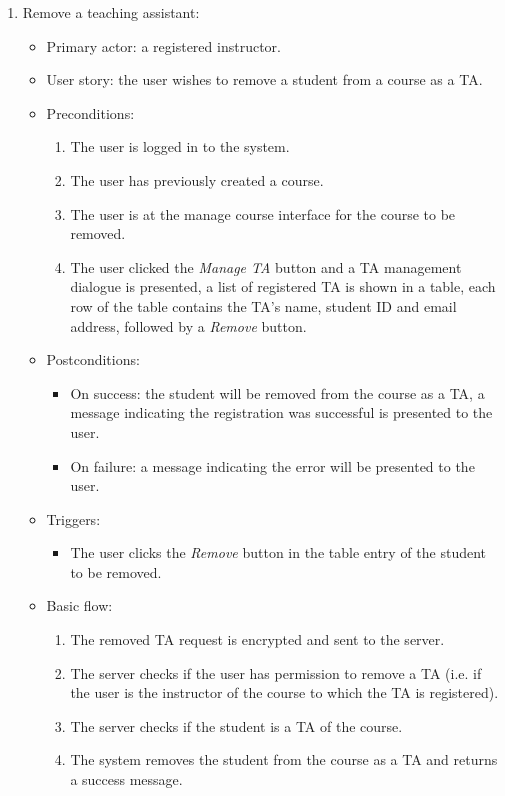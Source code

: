 \begin{enumerate}
\item Remove a teaching assistant:
\begin{itemize}
    \item Primary actor: a registered instructor.
    \item User story: the user wishes to remove a student from a course as a
        TA.
    \item Preconditions:
        \begin{enumerate}
            \item The user is logged in to the system.
            \item The user has previously created a course.
            \item The user is at the manage course interface for the course
                to be removed.
            \item The user clicked the \emph{Manage TA} button and a TA
                management dialogue is presented, a list of registered TA
                is shown in a table, each row of the table contains the TA's
                name, student ID and email address, followed by a \emph{Remove}
                button.
        \end{enumerate}
    \item Postconditions:
        \begin{itemize}
            \item On success: the student will be removed from the course
                as a TA, a message indicating the registration was
                successful is presented to the user.
            \item On failure: a message indicating the error will be presented
                to the user.
        \end{itemize}
    \item Triggers:
        \begin{itemize}
            \item The user clicks the \emph{Remove} button in the table entry
                of the student to be removed.
        \end{itemize}
    \item Basic flow:
        \begin{enumerate}
            \item The removed TA request is encrypted and sent to the server.
            \item The server checks if the user has permission to remove a
                TA (i.e. if the user is the instructor of the course to which
                the TA is registered).
            \item The server checks if the student is a TA of the course.
            \item The system removes the student from the course as a TA
                and returns a success message.
        \end{enumerate}
\end{itemize}

\end{enumerate}

